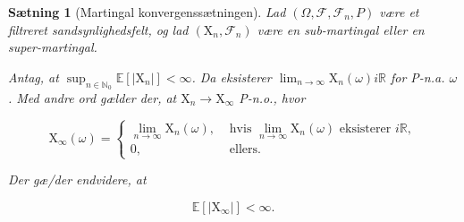 \documentclass{article}
\newcommand{\1}{\mathbbm{1}}
\theoremstyle{boxed}
\newtheorem{proposition}[theorem]{Sætning}
\begin{document}
\begin{theorem-box}
    \begin{proposition}[Martingal konvergenssætningen]
        Lad $\left(\Omega, \mathcal{F}, \mathcal{F}_n, P\right)$ være et filtreret sandsynlighedsfelt, og lad $\left(\mathrm{X}_n, \mathcal{F}_n\right)$ være en sub-martingal eller en super-martingal.

Antag, at $\sup _{n \in \mathbb{N}_0} \mathbb{E}\left[\left|\mathrm{X}_n\right|\right]<\infty$.
Da eksisterer $\lim _{n \rightarrow \infty} \mathrm{X}_n(\omega) i \mathbb{R}$ for P-n.a. $\omega$.
Med andre ord gælder der, at $\mathrm{X}_n \rightarrow \mathrm{X}_{\infty}$ P-n.o., hvor

$$
\mathrm{X}_{\infty}(\omega)= \begin{cases}\lim _{n \rightarrow \infty} \mathrm{X}_n(\omega), & \text { hvis } \lim _{n \rightarrow \infty} \mathrm{X}_n(\omega) \text { eksisterer } i \mathbb{R}, \\ 0, & \text { ellers. }\end{cases}
$$


Der gæ/der endvidere, at

$$
\mathbb{E}\left[\left|\mathrm{X}_{\infty}\right|\right]<\infty .
$$

    \end{proposition}
\end{theorem-box}
\end{document}
